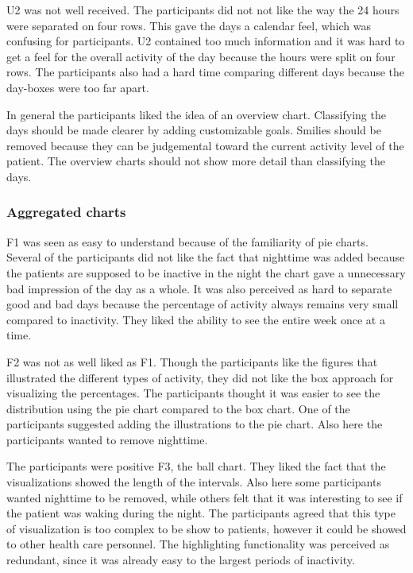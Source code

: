 U2 was not well received. The participants did not not like the way the 24 hours were separated on four rows. This gave the days a calendar feel, which was confusing for participants. U2 contained too much information and it was hard to get a feel for the overall activity of the day because the hours were split on four rows. The participants also had a hard time comparing different days because the day-boxes were too far apart.

In general the participants liked the idea of an overview chart. Classifying the days should be made clearer by adding customizable goals. Smilies should be removed because they can be judgemental toward the current activity level of the patient. The overview charts should not show more detail than classifying the days.

\subsubsection{Aggregated charts}
F1 was seen as easy to understand because of the familiarity of pie charts. Several of the participants did not like the fact that nighttime was added because the patients are supposed to be inactive in the night the chart gave a unnecessary bad impression of the day as a whole. It was also perceived as hard to separate good and bad days because the percentage of activity always remains very small compared to inactivity. They liked the ability to see the entire week once at a time.

F2 was not as well liked as F1. Though the participants like the figures that illustrated the different types of activity, they did not like the box approach for visualizing the percentages. The participants thought it was easier to see the distribution using the pie chart compared to the box chart. One of the participants suggested adding the illustrations to the pie chart. Also here the participants wanted to remove nighttime.

The participants were positive F3, the ball chart. They liked the fact that the visualizations showed the length of the intervals. Also here some participants wanted nighttime to be removed, while others felt that it was interesting to see if the patient was waking during the night. The participants agreed that this type of visualization is too complex to be show to patients, however it could be showed to other health care personnel. The highlighting functionality was perceived as redundant, since it was already easy to the largest periods of inactivity.

